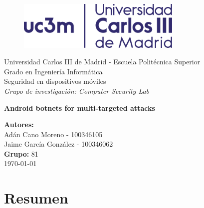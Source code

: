 \documentclass[a4paper,11pt]{report}
\begin{document}
\begin{titlepage}

\begin{center}
\vspace*{0.5in}
\begin{figure}[htb]
\begin{center}
\includegraphics[width=0.7\textwidth]{uc3m}
\end{center}
\end{figure}
\vspace*{1in}
Universidad Carlos III de Madrid - Escuela Politécnica Superior \\
Grado en Ingeniería Informática \\
Seguridad en dispositivos móviles \\

\vspace*{0.1in}
\emph{Grupo de investigación: Computer Security Lab}  \\

\vspace*{1.2in}
\begin{huge}
\textbf{Android botnets for multi-targeted attacks} \\
\end{huge}


\end{center}

\vfill
\begin{center}
\textbf{Autores:}\\
Adán Cano Moreno - 100346105\\
Jaime García González - 100346062\\
\vspace*{0.2in}
\textbf{Grupo:} 81\\
\vspace*{1in}
\today
\end{center}


\end{titlepage}


\tableofcontents
\thispagestyle{empty}
\chapter{Resumen}
\renewcommand{\thepage}{\arabic{page}}
\setcounter{page}{1}
\pagestyle{fancy}
\end{document}
